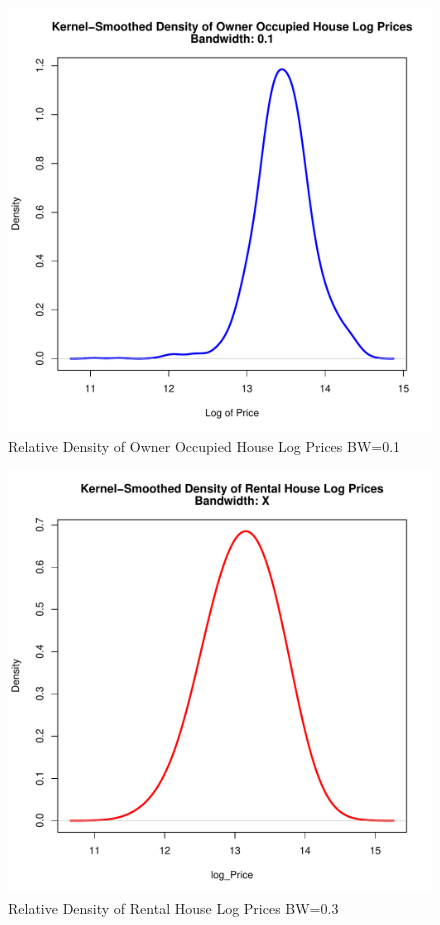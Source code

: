%
%
\begin{figure}[h!]
  \centering
  \includegraphics[scale = 0.5, keepaspectratio=true]{../Figures/log_density_Price_OO}
  \caption{Relative Density of Owner Occupied House Log Prices BW=0.1} \label{fig:log_density_Price_OO}
\end{figure}
%
%
\begin{figure}[h!]
  \centering
  \includegraphics[scale = 0.5, keepaspectratio=true]{../Figures/log_density_Price_Rental}
  \caption{Relative Density of Rental House Log Prices BW=0.3} \label{fig:log_density_Price_Rental}
\end{figure}
